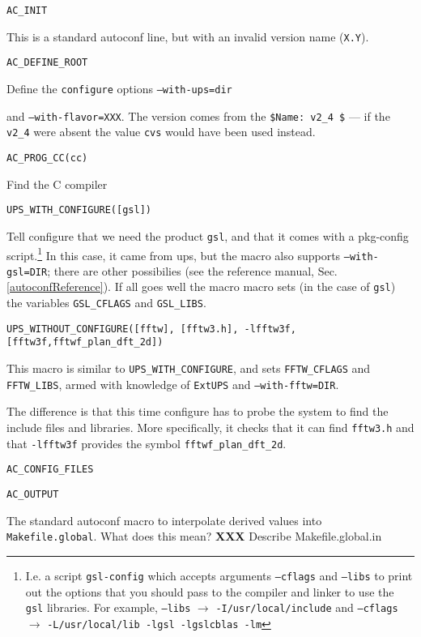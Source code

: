 \documentclass{article}
\newcommand{\XXX}[1]{\textbf{XXX} #1}
\newcommand{\code}[1]{\texttt{#1}}
\newcommand{\eups}{\code{ExtUPS}}
\begin{document}
\begin{itemize}
  \item{\texttt{AC\_INIT}

    This is a standard autoconf line, but with an invalid version name (\texttt{X.Y}).

  \item{\texttt{AC\_DEFINE\_ROOT}}

    Define the \texttt{configure} options \texttt{--with-ups=dir}} and \texttt{--with-flavor=XXX}.
    The version comes from the \texttt{\${Name}: v2\_4 \$} --- if the \texttt{v2\_4} were
    absent the value \texttt{cvs} would have been used instead.

  \item\texttt{AC\_PROG\_CC(cc)}

    Find the C compiler    

  \item\texttt{UPS\_WITH\_CONFIGURE([gsl])}

    Tell configure that we need the product \texttt{gsl}, and that it
    comes with a pkg-config script.\footnote{%
      I.e. a script \texttt{gsl-config} which accepts arguments \texttt{--cflags}
      and \texttt{--libs} to print out the options that you should pass to the
      compiler and linker to use the \texttt{gsl} libraries. For example,
      \texttt{--libs} $\rightarrow$ \texttt{-I/usr/local/include} and
      \texttt{--cflags} $\rightarrow$ \texttt{-L/usr/local/lib -lgsl -lgslcblas -lm}
      }
    In this case, it came from ups,
    but the macro also supports \texttt{--with-gsl=DIR}; there are
    other possibilies (see the reference manual,
    Sec. \ref{autoconfReference}).  If all goes well the macro macro sets (in the
    case of \texttt{gsl}) the variables \texttt{GSL\_CFLAGS} and \texttt{GSL\_LIBS}.

  \item\texttt{UPS\_WITHOUT\_CONFIGURE([fftw], [fftw3.h], -lfftw3f, [fftw3f,fftwf\_plan\_dft\_2d])}

    This macro is similar to \texttt{UPS\_WITH\_CONFIGURE}, and sets
    \texttt{FFTW\_CFLAGS} and \texttt{FFTW\_LIBS}, armed with knowledge of
    \eups{} and  \texttt{--with-fftw=DIR}.

    The difference is that this time configure has to probe the system
    to find the include files and libraries.  More specifically, it
    checks that it can find \texttt{fftw3.h} and that \texttt{-lfftw3f} provides the symbol
    \texttt{fftwf\_plan\_dft\_2d}.
    
  \item\texttt{AC\_CONFIG\_FILES}
  \item\texttt{AC\_OUTPUT}

    The standard autoconf macro to interpolate derived values
    into \texttt{Makefile.global}.  What does this mean?
    \XXX{Describe Makefile.global.in}
\end{itemize}
\end{document}
